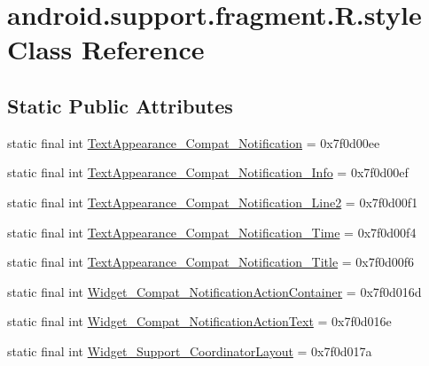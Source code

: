 \hypertarget{classandroid_1_1support_1_1fragment_1_1_r_1_1style}{}\section{android.\+support.\+fragment.\+R.\+style Class Reference}
\label{classandroid_1_1support_1_1fragment_1_1_r_1_1style}
\subsection*{Static Public Attributes}
\begin{DoxyCompactItemize}
\item 
static final int \mbox{\hyperlink{classandroid_1_1support_1_1fragment_1_1_r_1_1style_a75fd23171c1ec5a2afe8446cb68e7a8e}{Text\+Appearance\+\_\+\+Compat\+\_\+\+Notification}} = 0x7f0d00ee
\item 
static final int \mbox{\hyperlink{classandroid_1_1support_1_1fragment_1_1_r_1_1style_ad4e6951457d9f69a3a436c3c41038340}{Text\+Appearance\+\_\+\+Compat\+\_\+\+Notification\+\_\+\+Info}} = 0x7f0d00ef
\item 
static final int \mbox{\hyperlink{classandroid_1_1support_1_1fragment_1_1_r_1_1style_aad1cfd960bd97d348aaaab6a879784ad}{Text\+Appearance\+\_\+\+Compat\+\_\+\+Notification\+\_\+\+Line2}} = 0x7f0d00f1
\item 
static final int \mbox{\hyperlink{classandroid_1_1support_1_1fragment_1_1_r_1_1style_aeae65b00bad78c015474cfa32b793cde}{Text\+Appearance\+\_\+\+Compat\+\_\+\+Notification\+\_\+\+Time}} = 0x7f0d00f4
\item 
static final int \mbox{\hyperlink{classandroid_1_1support_1_1fragment_1_1_r_1_1style_af5cf680a4640942a5f8d9c1847399047}{Text\+Appearance\+\_\+\+Compat\+\_\+\+Notification\+\_\+\+Title}} = 0x7f0d00f6
\item 
static final int \mbox{\hyperlink{classandroid_1_1support_1_1fragment_1_1_r_1_1style_a2606c8d408b662743352ce596f5f5e82}{Widget\+\_\+\+Compat\+\_\+\+Notification\+Action\+Container}} = 0x7f0d016d
\item 
static final int \mbox{\hyperlink{classandroid_1_1support_1_1fragment_1_1_r_1_1style_a144bc7c25f26c31617e761b0d0ffc4a5}{Widget\+\_\+\+Compat\+\_\+\+Notification\+Action\+Text}} = 0x7f0d016e
\item 
static final int \mbox{\hyperlink{classandroid_1_1support_1_1fragment_1_1_r_1_1style_a7bf2fa74a3d613572e7f01d74b2f3973}{Widget\+\_\+\+Support\+\_\+\+Coordinator\+Layout}} = 0x7f0d017a
\end{DoxyCompactItemize}
